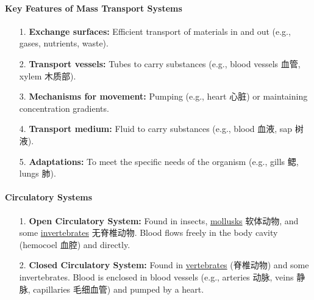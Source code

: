 \paragraph{Key Features of Mass Transport Systems}
\begin{itemize}
    \item[1.] \textbf{Exchange surfaces:} Efficient transport of materials in and out (e.g., gases, nutrients, waste).
    \item[2.] \textbf{Transport vessels:} Tubes to carry substances (e.g., blood vessels 血管, xylem 木质部).
    \item[3.] \textbf{Mechanisms for movement:} Pumping (e.g., heart 心脏) or maintaining concentration gradients.
    \item[4.] \textbf{Transport medium:} Fluid to carry substances (e.g., blood 血液, sap 树液).
    \item[5.] \textbf{Adaptations:} To meet the specific needs of the organism (e.g., gills 鳃, lungs 肺).
\end{itemize}

\paragraph{Circulatory Systems}
\begin{itemize}
    \item[1.] \textbf{Open Circulatory System:} Found in insects, \underline{mollusks} 软体动物, and some
    \underline{invertebrates} 无脊椎动物. Blood flows freely in the body cavity (hemocoel 血腔) and directly.
    \item[2.] \textbf{Closed Circulatory System:} Found in \underline{vertebrates} (脊椎动物) and some invertebrates. Blood is
    enclosed in blood vessels (e.g., arteries 动脉, veins 静脉, capillaries 毛细血管) and pumped by a heart.
\end{itemize}

